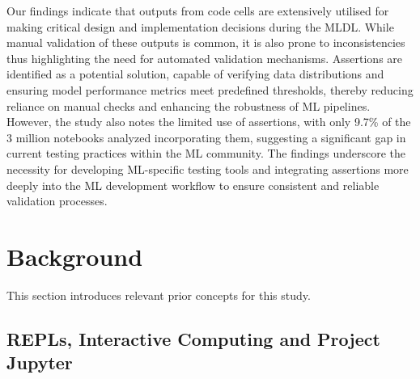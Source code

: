 Our findings indicate that outputs from code cells are extensively utilised for making critical design and implementation decisions during the MLDL. While manual validation of these outputs is common, it is also prone to inconsistencies thus highlighting the need for automated validation mechanisms. Assertions are identified as a potential solution, capable of verifying data distributions and ensuring model performance metrics meet predefined thresholds, thereby reducing reliance on manual checks and enhancing the robustness of ML pipelines. However, the study also notes the limited use of assertions, with only 9.7\% of the 3 million notebooks analyzed incorporating them, suggesting a significant gap in current testing practices within the ML community. The findings underscore the necessity for developing ML-specific testing tools and integrating assertions more deeply into the ML development workflow to ensure consistent and reliable validation processes.



\section{Background}\label{sec:background}

This section introduces relevant prior concepts for this study.

\subsection{REPLs, Interactive Computing and Project Jupyter}

